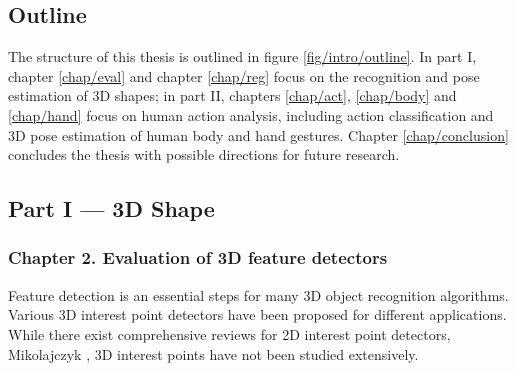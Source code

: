 \subsection{Outline}

The structure of this thesis is outlined in figure \ref{fig/intro/outline}. In part I, chapter \ref{chap/eval} and chapter \ref{chap/reg} focus on the recognition and pose estimation of 3D shapes; in part II, chapters \ref{chap/act}, \ref{chap/body} and \ref{chap/hand} focus on human action analysis, including action classification and 3D pose estimation of human body and hand gestures. Chapter \ref{chap/conclusion} concludes the thesis with possible directions for future research. 

\subsection*{Part I --- 3D Shape}


\subsubsection*{Chapter 2. Evaluation of 3D feature detectors} 

Feature detection is an essential steps for many 3D object recognition algorithms. Various 3D interest point detectors have been proposed for different applications. While there exist comprehensive reviews for 2D interest point detectors, \eg Mikolajczyk \etal \cite{Mikolajczyk2004}, 3D interest points have not been studied extensively. 

